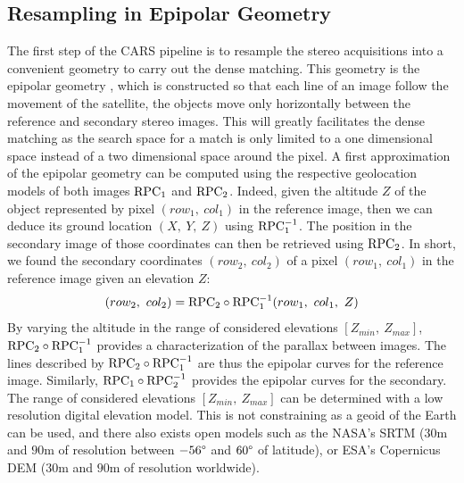 \subsection{Resampling in Epipolar Geometry}\label{sec:epipolar_geometry}
The first step of the CARS pipeline is to resample the stereo acquisitions into a convenient geometry to carry out the dense matching. This geometry is the epipolar geometry \cite{cnes_imagerie_2008} , which is constructed so that each line of an image follow the movement of the satellite, \ie the objects move only horizontally between the reference and secondary stereo images. This will greatly facilitates the dense matching as the search space for a match is only limited to a one dimensional space instead of a two dimensional space around the pixel. A first approximation of the epipolar geometry can be computed using the respective geolocation models of both images ${\mathrm{RPC}}_1$ and ${\mathrm{RPC}}_2$. Indeed, given the altitude $Z$ of the object represented by pixel $(row_1, ~col_1)$ in the reference image, then we can deduce its ground location $(X, ~Y, ~Z)$ using ${\mathrm{RPC}}_1^{-1}$. The position in the secondary image of those coordinates can then be retrieved using ${\mathrm{RPC}}_2$. In short, we found the secondary coordinates $(row_2,~col_2)$ of a pixel $(row_1,~col_1)$ in the reference image given an elevation $Z$: 
\begin{equation}
    (row_2,~col_2) = {\mathrm{RPC}}_2\circ{\mathrm{RPC}}_1^{-1}(row_1, ~col_1, ~Z)\label{eq:epipolar_transfer}
\end{equation}
By varying the altitude in the range of considered elevations $[Z_{min},~Z_{max}]$, ${\mathrm{RPC}}_2\circ{\mathrm{RPC}}_1^{-1}$ provides a characterization of the parallax between images. The lines described by ${\mathrm{RPC}}_2\circ{\mathrm{RPC}}_1^{-1}$ are thus the epipolar curves for the reference image. Similarly, ${\mathrm{RPC}}_1\circ{\mathrm{RPC}}_2^{-1}$ provides the epipolar curves for the secondary. The range of considered elevations $[Z_{min},~Z_{max}]$ can be determined with a low resolution digital elevation model. This is not constraining as a geoid of the Earth can be used, and there also exists open models such as the NASA's SRTM \cite{farr_shuttle_2007} ($30$m and $90$m of resolution between $-56\degree$ and $60\degree$ of latitude), or ESA's Copernicus DEM ($30$m and $90$m of resolution worldwide). 

